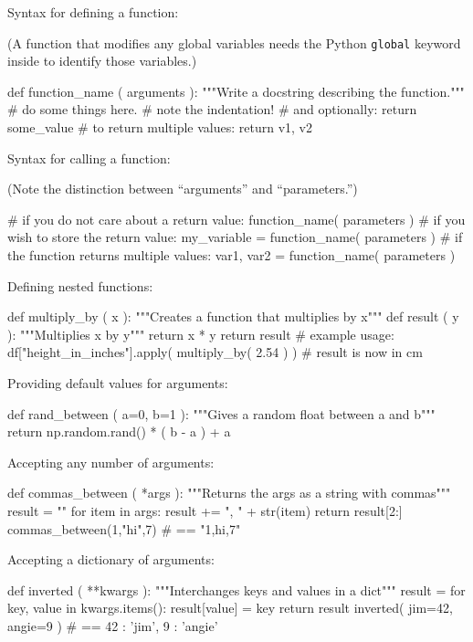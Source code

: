 \documentclass[a4paper,landscape,columns=3]{cheatsheet}
\begin{document}
Syntax for defining a function:

(A function that modifies any global variables needs the Python \lstinline{global} keyword inside to identify those variables.)
\begin{python}
def function_name ( arguments ):
    """Write a docstring describing the function."""
    # do some things here.
    # note the indentation!
    # and optionally:
    return some_value
    # to return multiple values: return v1, v2
\end{python}

Syntax for calling a function:

(Note the distinction between ``arguments''  and ``parameters.'')
\begin{python}
# if you do not care about a return value:
function_name( parameters )
# if you wish to store the return value:
my_variable = function_name( parameters )
# if the function returns multiple values:
var1, var2 = function_name( parameters )
\end{python}

Defining nested functions:
\begin{python}
def multiply_by ( x ):
    """Creates a function that multiplies by x"""
    def result ( y ):
        """Multiplies x by y"""
        return x * y
    return result
# example usage:
df["height_in_inches"].apply(
    multiply_by( 2.54 ) )  # result is now in cm
\end{python}

Providing default values for arguments:
\begin{python}
def rand_between ( a=0, b=1 ):
    """Gives a random float between a and b"""
    return np.random.rand() * ( b - a ) + a
\end{python}

Accepting any number of arguments:
\begin{python}
def commas_between ( *args ):
    """Returns the args as a string with commas"""
    result = ""
    for item in args:
        result += ", " + str(item)
    return result[2:]
commas_between(1,"hi",7)    # == "1,hi,7"
\end{python}

Accepting a dictionary of arguments:
\begin{python}
def inverted ( **kwargs ):
    """Interchanges keys and values in a dict"""
    result = {}
    for key, value in kwargs.items():
        result[value] = key
    return result
inverted( jim=42, angie=9 )
        # == { 42 : 'jim', 9 : 'angie' }
\end{python}
\end{document}

